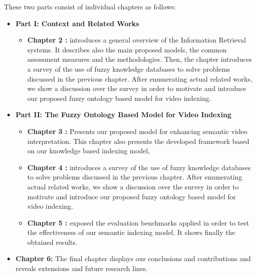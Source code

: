 These two parts consist of individual chapters as follows:
\begin{itemize}
	\item \textbf{Part I: Context and Related Works}
		\begin{itemize}
			\item \textbf{Chapter 2 :} introduces a general overview of the Information Retrieval systems. 
								It describes also the main proposed models, the common assessment measures and the methodologies. Then, the chapter introduces a survey of the use of fuzzy knowledge databases
								to solve problems discussed in the previous chapter. 
								After enumerating actual related works, we show a discussion over the survey in order to motivate and introduce 
								our proposed fuzzy ontology based model for video indexing.
		\end{itemize}
	\item \textbf{Part II: The Fuzzy Ontology Based Model for Video Indexing}
			\begin{itemize}
			\item \textbf{Chapter 3 :} Presents our proposed model for enhancing semantic video interpretation. 
								This chapter also presents the developed framework based on our knowledge based indexing model,
			\item \textbf{Chapter 4 :} introduces a survey of the use of fuzzy knowledge databases
								to solve problems discussed in the previous chapter. 
								After enumerating actual related works, we show a discussion over the survey in order to motivate and introduce 
								our proposed fuzzy ontology based model for video indexing.
			\item \textbf{Chapter 5 :} exposed the evaluation benchmarks applied  in order to test the effectiveness 
								of our semantic indexing model. It shows finally the obtained results.
 		\end{itemize}
	\item \textbf{Chapter 6:} The final chapter displays our conclusions and contributions 
												and reveals extensions and future research lines.
\end{itemize}


